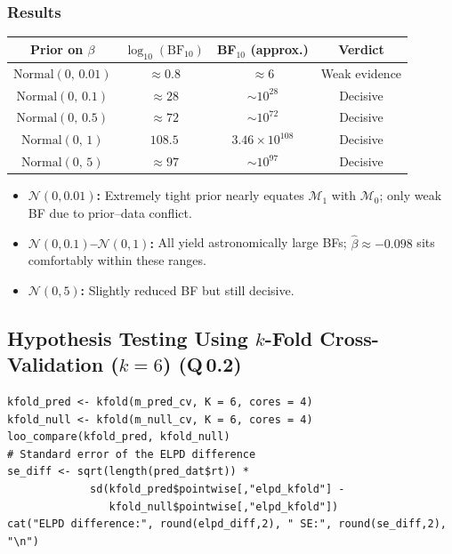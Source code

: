 \documentclass[12pt,a4paper]{article}
\begin{document}
\subsubsection{Results}
\vspace{-10pt}
\begin{tcolorbox}[resultbox, title={Bayes Factor Results}]
\begin{center}
\renewcommand{\arraystretch}{1.4}
\begin{tabular}{cccc}
  \toprule
  \textbf{Prior on $\beta$} & \textbf{$\log_{10}(\mathrm{BF}_{10})$} & \textbf{BF$_{10}$ (approx.)} & \textbf{Verdict} \\
  \midrule
  $\mathrm{Normal}(0,\,0.01)$ & $\approx 0.8$  & $\approx 6$           & Weak evidence \\
  $\mathrm{Normal}(0,\,0.1)$  & $\approx 28$   & $\sim 10^{28}$        & Decisive \\
  $\mathrm{Normal}(0,\,0.5)$  & $\approx 72$   & $\sim 10^{72}$        & Decisive \\
  $\mathrm{Normal}(0,\,1)$    & $108.5$        & $3.46\times10^{108}$  & Decisive \\
  $\mathrm{Normal}(0,\,5)$    & $\approx 97$   & $\sim 10^{97}$        & Decisive \\
  \bottomrule
\end{tabular}
\end{center}
\end{tcolorbox}
\vspace{-12pt}
\begin{itemize}[leftmargin=1.5cm, itemsep=3pt]
  \item \textbf{$\mathcal{N}(0,0.01)$:} Extremely tight prior nearly equates $\mathcal{M}_1$ with $\mathcal{M}_0$; only weak BF due to prior--data conflict.
  \item \textbf{$\mathcal{N}(0,0.1)$--$\mathcal{N}(0,1)$:} All yield astronomically large BFs; $\hat{\beta}\approx-0.098$ sits comfortably within these ranges.
  \item \textbf{$\mathcal{N}(0,5)$:} Slightly reduced BF but still decisive.
\end{itemize}
\vspace{-12pt}
\subsection{Hypothesis Testing Using $k$-Fold Cross-Validation ($k=6$) (Q\,0.2)}

\begin{lstlisting}
kfold_pred <- kfold(m_pred_cv, K = 6, cores = 4)
kfold_null <- kfold(m_null_cv, K = 6, cores = 4)
loo_compare(kfold_pred, kfold_null)
# Standard error of the ELPD difference
se_diff <- sqrt(length(pred_dat$rt)) *
             sd(kfold_pred$pointwise[,"elpd_kfold"] -
                kfold_null$pointwise[,"elpd_kfold"])
cat("ELPD difference:", round(elpd_diff,2), " SE:", round(se_diff,2), "\n")
\end{lstlisting}
\end{document}
